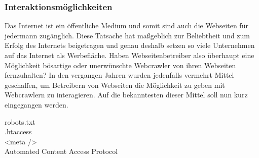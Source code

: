 \subsubsection{Interaktionsmöglichkeiten}
Das Internet ist ein öffentliche Medium und somit sind auch die Webseiten für jedermann zugänglich. Diese Tatsache hat maßgeblich zur Beliebtheit und zum Erfolg des Internets beigetragen und genau deshalb setzen so viele Unternehmen auf das Internet als Werbefläche. Haben Webseitenbetreiber also überhaupt eine Möglichkeit bösartige oder unerwünschte Webcrawler von ihren Webseiten fernzuhalten? In den vergangen Jahren wurden jedenfalls vermehrt Mittel geschaffen, um Betreibern von Webseiten die Möglichkeit zu geben mit Webcrawlern zu interagieren. Auf die bekanntesten dieser Mittel soll nun kurz eingegangen werden.
\begin{description}
	\item[robots.txt]
	
	\item[.htaccess]
	
	\item[<meta />]
	
	\item[Automated Content Access Protocol]
	
\end{description}
